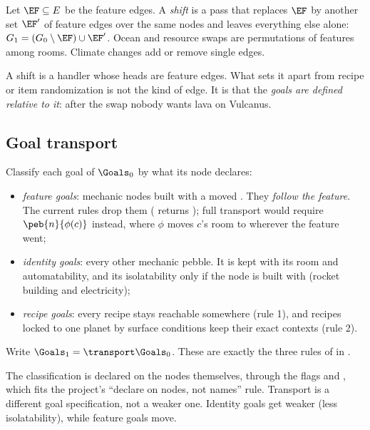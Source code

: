 \begin{definition}[Shift]
Let $\EF\subseteq E$ be the feature edges. A \emph{shift} is a pass that replaces $\EF$ by another set $\EF'$ of feature edges over the same nodes and leaves everything else alone: $G_1=(G_0\setminus \EF)\cup \EF'$. Ocean and resource swaps are permutations of features among rooms. Climate changes add or remove single edges.
\end{definition}

A shift is a handler whose heads are feature edges. What sets it apart from recipe or item randomization is not the kind of edge. It is that the \emph{goals are defined relative to it}: after the swap nobody wants lava on Vulcanus.

\subsection{Goal transport}

\begin{definition}\label{def:transport}
Classify each goal of $\Goals_0$ by what its node declares:
\begin{itemize}[nosep]
\item \emph{feature goals}: mechanic nodes built with a moved . They \emph{follow the feature}. The current rules drop them ( returns ); full transport would require $\peb{n}{\phi(c)}$ instead, where $\phi$ moves $c$'s room to wherever the feature went;
\item \emph{identity goals}: every other mechanic pebble. It is kept with its room and automatability, and its isolatability only if the node is built with  (rocket building and electricity);
\item \emph{recipe goals}: every recipe stays reachable somewhere (rule 1), and recipes locked to one planet by surface conditions keep their exact contexts (rule 2).
\end{itemize}
Write $\Goals_1=\transport\Goals_0$. These are exactly the three rules of  in .
\end{definition}

The classification is declared on the nodes themselves, through the flags  and , which fits the project's ``declare on nodes, not names'' rule. Transport is a different goal specification, not a weaker one. Identity goals get weaker (less isolatability), while feature goals move.

